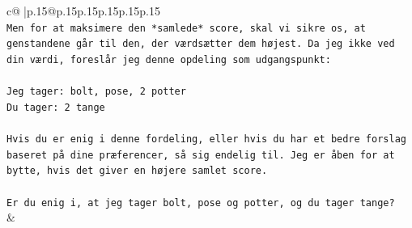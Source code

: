 \documentclass{article}
\begin{document}
{\begin{supertabular}{c@{$\;$}|p{.15\linewidth}@{}p{.15\linewidth}p{.15\linewidth}p{.15\linewidth}p{.15\linewidth}p{.15\linewidth}}
{{{\\ 
\texttt{Men for at maksimere den *samlede* score, skal vi sikre os, at genstandene går til den, der værdsætter dem højest. Da jeg ikke ved din værdi, foreslår jeg denne opdeling som udgangspunkt:} \\
\\ 
\texttt{Jeg tager: bolt, pose, 2 potter} \\
\texttt{Du tager: 2 tange} \\
\\ 
\texttt{Hvis du er enig i denne fordeling, eller hvis du har et bedre forslag baseret på dine præferencer, så sig endelig til. Jeg er åben for at bytte, hvis det giver en højere samlet score.} \\
\\ 
\texttt{Er du enig i, at jeg tager bolt, pose og potter, og du tager tange?} \\
            }
        }
    }
    & \\ \\


\end{supertabular}}
\end{document}
